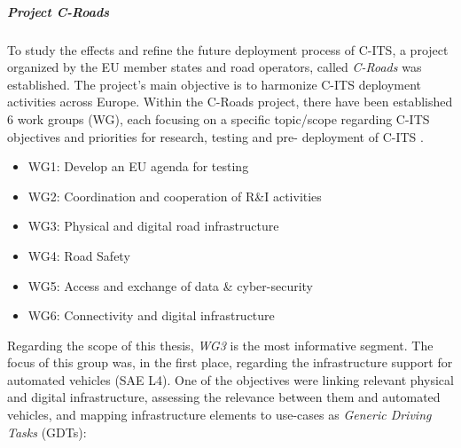 \documentclass[0main.tex]{subfiles}
\begin{document}

\subparagraph{Project C-Roads}\label{sec-croads}

To study the effects and refine the future deployment process of C-ITS, a project 
organized by the EU member states and road operators, called \emph{C-Roads} was established. 
The project's main objective is to harmonize C-ITS deployment activities across Europe. 
Within the C-Roads project, there have been established 6 work groups (WG), each focusing on a 
specific topic/scope regarding C-ITS objectives and priorities for research, testing and pre-
deployment of C-ITS \cite{Commision2021}. 

\begin{itemize}
    \item WG1: Develop an EU agenda for testing
    \item WG2: Coordination and cooperation of R\&I activities
    \item WG3: Physical and digital road infrastructure
    \item WG4: Road Safety
    \item WG5: Access and exchange of data \& cyber-security
    \item WG6: Connectivity and digital infrastructure
\end{itemize}

Regarding the scope of this thesis, \emph{WG3} is the most informative segment. The focus of this group 
was, in the first place, regarding the infrastructure support for automated vehicles (SAE L4). One of 
the objectives were linking relevant physical and digital infrastructure, assessing the relevance between 
them and automated vehicles, and mapping infrastructure elements to use-cases as \emph{Generic Driving 
Tasks} (GDTs):
\end{document}
